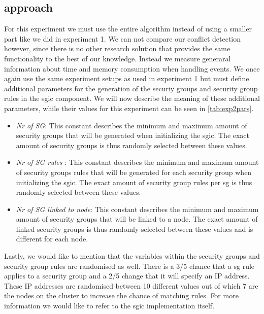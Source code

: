 \subsection{approach} \label{exp2:approach}
For this experiment we must use the entire algorithm instead of using a smaller part like we did in experiment 1. We can not compare our conflict detection however, since there is no other research solution that provides the same functionality to the best of our knowledge. Instead we measure generaral information about time and memory consumption when handling events. We once again use the same experiment setups as used in experiment 1 but must define additional parameters for the generation of the securiy groups and security group rules in the \acrshort{sgic} component. We will now describe the meaning of these additional parameters, while their values for this experiment can be seen in \autoref{tab:exp2pars}.

\begin{itemize}
    \item \textit{Nr of SG}: This constant describes the minimum and maximum amount of security groups that will be generated when initializing the \acrshort{sgic}. The exact amount of security groups is thus randomly selected between these values.
    \item \textit{Nr of SG rules }: This constant describes the minimum and maximum amount of security groups rules that will be generated for each security group when initializing the \acrshort{sgic}. The exact amount of security group rules per \acrshort{sg} is thus randomly selected between these values.
    \item \textit{Nr of SG linked to node}: This constant describes the minimum and maximum amount of security groups that will be linked to a node. The exact amount of linked security groups is thus randomly selected between these values and is different for each node.
\end{itemize}

Lastly, we would like to mention that the variables within the security groups and security group rules are randomised as well. There is a 3\slash 5 chance that a \acrshort{sg} rule applies to a security group and a 2\slash 5  change that it will specify an IP address. These IP addresses are randomised between 10 different values out of which 7 are the nodes on the cluster to increase the chance of matching rules.  For more information we would like to refer to the \acrshort{sgic} implementation itself. 


